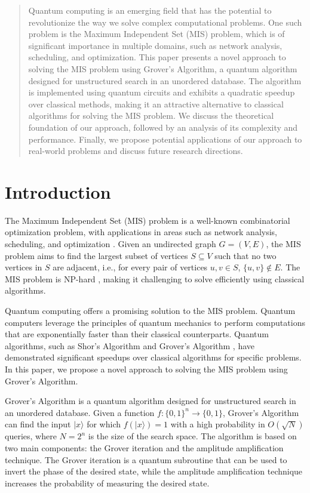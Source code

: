 
\begin{abstract}
Quantum computing is an emerging field that has the potential to revolutionize the way we solve complex computational problems. One such problem is the Maximum Independent Set (MIS) problem, which is of significant importance in multiple domains, such as network analysis, scheduling, and optimization. This paper presents a novel approach to solving the MIS problem using Grover's Algorithm, a quantum algorithm designed for unstructured search in an unordered database. The algorithm is implemented using quantum circuits and exhibits a quadratic speedup over classical methods, making it an attractive alternative to classical algorithms for solving the MIS problem. We discuss the theoretical foundation of our approach, followed by an analysis of its complexity and performance. Finally, we propose potential applications of our approach to real-world problems and discuss future research directions.

\end{abstract}


\section{Introduction}
\label{sec:introduction}

The Maximum Independent Set (MIS) problem is a well-known combinatorial optimization problem, with applications in areas such as network analysis, scheduling, and optimization \cite{mis_applications}. Given an undirected graph $G=(V, E)$, the MIS problem aims to find the largest subset of vertices $S \subseteq V$ such that no two vertices in $S$ are adjacent, i.e., for every pair of vertices $u, v \in S$, $\{u, v\} \notin E$. The MIS problem is NP-hard \cite{np_hard}, making it challenging to solve efficiently using classical algorithms.

Quantum computing offers a promising solution to the MIS problem. Quantum computers leverage the principles of quantum mechanics to perform computations that are exponentially faster than their classical counterparts. Quantum algorithms, such as Shor's Algorithm \cite{shor} and Grover's Algorithm \cite{grover}, have demonstrated significant speedups over classical algorithms for specific problems. In this paper, we propose a novel approach to solving the MIS problem using Grover's Algorithm.

Grover's Algorithm is a quantum algorithm designed for unstructured search in an unordered database. Given a function $f: \{0, 1\}^n \rightarrow \{0, 1\}$, Grover's Algorithm can find the input $\vert x \rangle$ for which $f(\vert x \rangle) = 1$ with a high probability in $O(\sqrt{N})$ queries, where $N = 2^n$ is the size of the search space. The algorithm is based on two main components: the Grover iteration and the amplitude amplification technique. The Grover iteration is a quantum subroutine that can be used to invert the phase of the desired state, while the amplitude amplification technique increases the probability of measuring the desired state.

